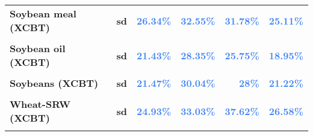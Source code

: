 \documentclass[
  authoryear,
  preprint,
  3p]{elsarticle}
\begin{document}
\begin{longtable}[t]{>{}l>{}l>{}r>{}r>{}r>{}r}
\addlinespace
\textbf{Soybean meal (XCBT)} & \textbf{sd} & \textcolor[HTML]{4285f4}{\textbf{26.34\%}} & \textcolor[HTML]{4285f4}{\textbf{32.55\%}} & \textcolor[HTML]{4285f4}{\textbf{31.78\%}} & \textcolor[HTML]{4285f4}{\textbf{25.11\%}}\\
\textbf{\cellcolor{gray!10}{Soybean oil (XCBT)}} & \textbf{\cellcolor{gray!10}{mean}} & \textcolor[HTML]{4285f4}{\textbf{\cellcolor{gray!10}{6.21\%}}} & \textcolor[HTML]{4285f4}{\textbf{\cellcolor{gray!10}{15.57\%}}} & \textcolor[HTML]{4285f4}{\textbf{\cellcolor{gray!10}{4.04\%}}} & \textcolor[HTML]{4285f4}{\textbf{\cellcolor{gray!10}{-7.39\%}}}\\
\textbf{Soybean oil (XCBT)} & \textbf{sd} & \textcolor[HTML]{4285f4}{\textbf{21.43\%}} & \textcolor[HTML]{4285f4}{\textbf{28.35\%}} & \textcolor[HTML]{4285f4}{\textbf{25.75\%}} & \textcolor[HTML]{4285f4}{\textbf{18.95\%}}\\
\textbf{\cellcolor{gray!10}{Soybeans (XCBT)}} & \textbf{\cellcolor{gray!10}{mean}} & \textcolor[HTML]{4285f4}{\textbf{\cellcolor{gray!10}{6.89\%}}} & \textcolor[HTML]{4285f4}{\textbf{\cellcolor{gray!10}{13.36\%}}} & \textcolor[HTML]{4285f4}{\textbf{\cellcolor{gray!10}{6.19\%}}} & \textcolor[HTML]{4285f4}{\textbf{\cellcolor{gray!10}{-3.82\%}}}\\
\textbf{Soybeans (XCBT)} & \textbf{sd} & \textcolor[HTML]{4285f4}{\textbf{21.47\%}} & \textcolor[HTML]{4285f4}{\textbf{30.04\%}} & \textcolor[HTML]{4285f4}{\textbf{28\%}} & \textcolor[HTML]{4285f4}{\textbf{21.22\%}}\\
\addlinespace
\textbf{\cellcolor{gray!10}{Wheat-SRW (XCBT)}} & \textbf{\cellcolor{gray!10}{mean}} & \textcolor[HTML]{4285f4}{\textbf{\cellcolor{gray!10}{5.07\%}}} & \textcolor[HTML]{4285f4}{\textbf{\cellcolor{gray!10}{17.63\%}}} & \textcolor[HTML]{4285f4}{\textbf{\cellcolor{gray!10}{6.68\%}}} & \textcolor[HTML]{4285f4}{\textbf{\cellcolor{gray!10}{-1.58\%}}}\\
\textbf{Wheat-SRW (XCBT)} & \textbf{sd} & \textcolor[HTML]{4285f4}{\textbf{24.93\%}} & \textcolor[HTML]{4285f4}{\textbf{33.03\%}} & \textcolor[HTML]{4285f4}{\textbf{37.62\%}} & \textcolor[HTML]{4285f4}{\textbf{26.58\%}}\\
\textbf{\cellcolor{gray!10}{Cattle-feeder (XCME)}} & \textbf{\cellcolor{gray!10}{mean}} & \textcolor[HTML]{4285f4}{\textbf{\cellcolor{gray!10}{0.39\%}}} & \textcolor[HTML]{4285f4}{\textbf{\cellcolor{gray!10}{7.43\%}}} & \textcolor[HTML]{4285f4}{\textbf{\cellcolor{gray!10}{7.13\%}}} & \textcolor[HTML]{4285f4}{\textbf{\cellcolor{gray!10}{1.87\%}}}\\

\end{longtable}
\end{document}
